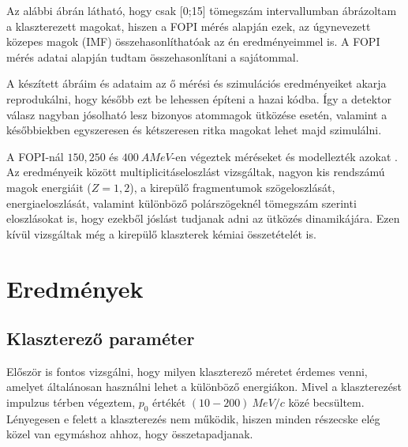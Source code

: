 \documentclass[a4paper,12pt]{article}
\begin{document}
\vspace{5mm}

\par Az alábbi ábrán látható, hogy csak [0;15] tömegszám intervallumban ábrázoltam a klaszterezett magokat, hiszen a FOPI mérés alapján ezek, az úgynevezett közepes magok (IMF) összehasonlíthatóak az én eredményeimmel is. A FOPI mérés adatai \cite{REISDORF1997493, SANTINI2005468} alapján tudtam összehasonlítani a sajátommal.

\vspace{5mm}

\par A készített ábráim és adataim az ő mérési és szimulációs eredményeiket akarja reprodukálni, hogy később ezt be lehessen építeni a hazai kódba. Így a detektor válasz nagyban jósolható lesz bizonyos atommagok ütközése esetén, valamint a későbbiekben egyszeresen és kétszeresen ritka magokat lehet majd szimulálni.

\vspace{5mm}

\par A FOPI-nál $150, 250$ és $400 ~A MeV$-en végeztek méréseket és modellezték azokat \cite{REISDORF1997493}. Az eredményeik között multiplicitáseloszlást vizsgáltak, nagyon kis rendszámú magok energiáit ($ Z = 1,2$), a kirepülő fragmentumok szögeloszlását, energiaeloszlását, valamint különböző polárszögeknél tömegszám szerinti eloszlásokat is, hogy ezekből jóslást tudjanak adni az ütközés dinamikájára. Ezen kívül vizsgáltak még a kirepülő klaszterek kémiai összetételét is. 

\section{ Eredmények}

\vspace{5mm}

\subsection{ Klaszterező paraméter}

\vspace{5mm}

\par Először is fontos vizsgálni, hogy milyen klaszterező méretet érdemes venni, amelyet általánosan használni lehet a különböző energiákon. Mivel a klaszterezést impulzus térben végeztem, $p_{0}$ értékét $(10 - 200) ~MeV/c$ közé becsültem. Lényegesen e felett a klaszterezés nem működik, hiszen minden részecske elég közel van egymáshoz ahhoz, hogy összetapadjanak. 
\end{document}
